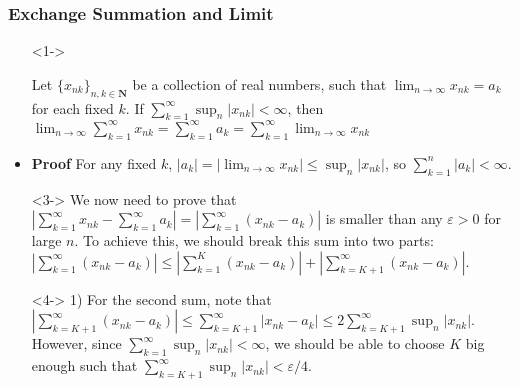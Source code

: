 \documentclass[handout]{beamer}
\begin{document}
\frame
{
  \frametitle{Exchange Summation and Limit}

   \begin{itemize}
   
      \item[]<1-> \begin{Theorem} Let $\{x_{nk}\}_{n,k\in\mathbf{N}}$ be a collection of real numbers, such that $\lim_{n\rightarrow \infty} x_{nk}=a_k$ for each fixed $k$. If $\sum_{k=1}^{\infty} \sup_n |x_{nk}|<\infty$, then $\lim_{n\rightarrow \infty } \sum_{k=1}^{\infty} x_{nk}=\sum_{k=1}^{\infty} a_k = \sum_{k=1}^{\infty} \lim_{n\rightarrow \infty } x_{nk}$\end{Theorem} 
 
  \item<2-> \textbf{Proof} For any fixed $k$, $|a_k|=|\lim_{n\rightarrow \infty} x_{nk}|  \leq \sup_n |x_{nk}|$, so $\sum_{k=1}^n |a_k|<\infty$.
  
  
  
     \item[]<3-> We now need to prove that $ |\sum_{k=1}^{\infty} x_{nk}- \sum_{k=1}^{\infty} a_k|=  |\sum_{k=1}^{\infty} ( x_{nk}- a_k)| $ is smaller than any $\varepsilon>0$ for large $n$. To achieve this, we should break this sum into two parts: $ |\sum_{k=1}^{\infty} ( x_{nk}- a_k)| \leq |\sum_{k=1}^{K} ( x_{nk}- a_k) |+|\sum_{k=K+1}^{\infty} ( x_{nk}- a_k)| $.
     
     \item[]<4-> 1) For the second sum, note that $|\sum_{k=K+1}^{\infty} ( x_{nk}- a_k)| \leq \sum_{k=K+1}^{\infty} | x_{nk}- a_k| \leq 2 \sum_{k=K+1}^{\infty} \sup_n |x_{nk}| $. However, since $\sum_{k=1}^{\infty} \sup_n |x_{nk}|<\infty$, we should be able to choose $K$ big enough such that $\sum_{k={K+1}}^{\infty} \sup_n |x_{nk}|<\varepsilon/4$.
     
    
 
       
  \end{itemize}
}
\end{document}
